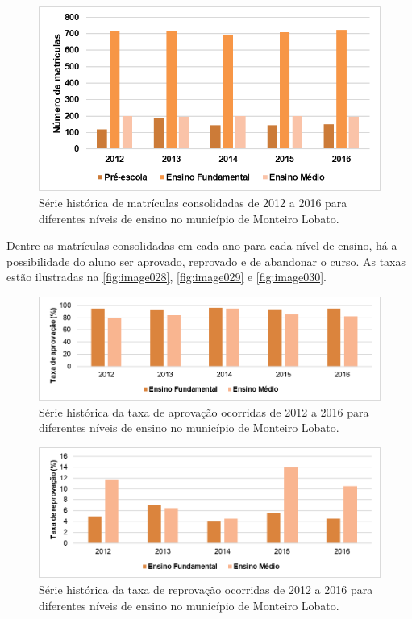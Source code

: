 \begin{figure}[h!]
	\centering
	\includegraphics[width=0.8\linewidth]{produtos/proddois/image027}
	\caption{Série histórica de matrículas consolidadas de 2012 a 2016 para diferentes níveis de ensino no município de Monteiro Lobato.}
	\label{fig:image027}
\end{figure}

Dentre as matrículas consolidadas em cada ano para cada nível de ensino, há a possibilidade do aluno ser aprovado, reprovado e de abandonar o curso. As taxas estão ilustradas na \autoref{fig:image028}, \autoref{fig:image029} e \autoref{fig:image030}.

\begin{figure}[h!]
	\centering
	\includegraphics[width=1\linewidth]{produtos/proddois/image028}
	\caption{Série histórica da taxa de aprovação ocorridas de 2012 a 2016 para diferentes níveis de ensino no município de Monteiro Lobato.}
	\label{fig:image028}
\end{figure}

\begin{figure}[h!]
	\centering
	\includegraphics[width=1\linewidth]{produtos/proddois/image029}
	\caption{Série histórica da taxa de reprovação ocorridas de 2012 a 2016 para diferentes níveis de ensino no município de Monteiro Lobato.}
	\label{fig:image029}
\end{figure}

